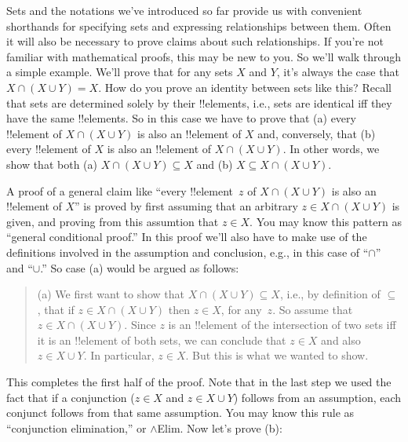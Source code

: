\documentclass[../../include/open-logic-section]{subfiles}
\begin{document}

\begin{explain}
Sets and the notations we've introduced so far provide us with
convenient shorthands for specifying sets and expressing relationships
between them.  Often it will also be necessary to prove claims about
such relationships.  If you're not familiar with mathematical proofs,
this may be new to you.  So we'll walk through a simple example.  We'll
prove that for any sets $X$ and $Y$, it's always the case that $X \cap
(X \cup Y) = X$.  How do you prove an identity between sets like this?
Recall that sets are determined solely by their !!{element}s, i.e.,
sets are identical iff they have the same !!{element}s.  So in this
case we have to prove that (a) every !!{element} of $X \cap (X \cup
Y)$ is also an !!{element} of $X$ and, conversely, that (b) every
!!{element} of $X$ is also an !!{element} of $X \cap (X \cup Y)$.  In
other words, we show that both (a) $X \cap (X \cup Y) \subseteq X$ and
(b) $X \subseteq X \cap (X \cup Y)$.

A proof of a general claim like ``every !!{element}~$z$ of $X \cap (X
\cup Y)$ is also an !!{element} of $X$'' is proved by first assuming
that an arbitrary $z \in X \cap (X \cup Y)$ is given, and proving from
this assumtion that $z \in X$.  You may know this pattern as ``general
conditional proof.''  In this proof we'll also have to make use of the
definitions involved in the assumption and conclusion, e.g., in this
case of ``$\cap$'' and ``$\cup$.''  So case (a) would be argued as
follows:

\begin{quote}
(a) We first want to show that $X \cap (X \cup Y) \subseteq X$, i.e.,
by definition of $\subseteq$, that if $z \in X \cap (X \cup Y)$ then
$z \in X$, for any~$z$.  So assume that $z \in X \cap (X \cup
Y)$. Since $z$ is an !!{element} of the intersection of two sets iff
it is an !!{element} of both sets, we can conclude that $z \in X$ and
also $z \in X \cup Y$.  In particular, $z \in X$.  But this is what
we wanted to show.
\end{quote}

This completes the first half of the proof.  Note that in the last
step we used the fact that if a conjunction ($z \in X$ and $z \in X
\cup Y$) follows from an assumption, each conjunct follows from that
same assumption.  You may know this rule as ``conjunction
elimination,'' or $\land$Elim.  Now let's prove (b):


\end{explain}
\end{document}
